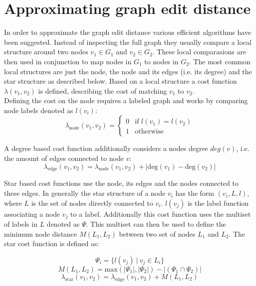 \documentclass[
    12pt,                               %
    DIV=14,                     %
    parskip=half+,              %
    bigheadings,                %
    cleardoubleempty,   %
    halfparskip,                %
    ]{scrreprt} %
\begin{document}
\section{Approximating graph edit distance} \label{sec:approxeditdistance}
In order to approximate the graph edit distance various efficient algorithms have been suggested. Instead of inspecting the full graph they usually compare a local structure around two nodes $v_1 \in G_1$ and $v_2 \in G_2$. These local comparasions are then used in conjunction to map nodes in $G_1$ to nodes in $G_2$. The most common local structures are just the node, the node and its edges (i.e. its degree) and the star structure as described below\cite{commoncost1, commoncost2}. Based on a local structure a cost function $\lambda(v_1, v_2)$ is defined, describing the cost of matching $v_1$ to $v_2$. \\
Defining the cost on the node requires a labeled graph and works by comparing node labels denoted as $l(v_i)$:
\begin{equation}
	\lambda_{\text{node}}(v_1, v_2) = \begin{cases}
		0 & \text{if } l(v_1) = l(v_2) \\
		1 & \text{otherwise}
	\end{cases}
\end{equation}

A degree based cost function additionally considers a nodes degree $deg(v)$, i.e. the amount of edges connected to node $v$:
\begin{equation}
	\lambda_{\text{edge}}(v_1, v_2) = \lambda_{\text{node}}(v_1, v_2) + |\text{deg}(v_1) - \text{deg}(v_2)|
\end{equation}

Star based cost functions use the node, its edges and the nodes connected to these edges. In generally the star structure of a node $v_i$ has the form $(v_i, L, l)$, where $L$ is the set of nodes directly connected to $v_i$. $l(v_j)$ is the label function associating a node $v_j$ to a label. Additionally this cost function uses the multiset of labels in $L$ denoted as $\Psi$. This multiset can then be used to define the minimum node distance $M(L_1, L_2)$ between two set of nodes $L_1$ and $L_2$. The star cost function is defined as\cite{compstars}:

\begin{equation}
	\Psi_i = \{ l(v_j) \: | \: v_j \in L_i \}
\end{equation}
\begin{equation}
	M(L_1, L_2) = \text{max}(|\Psi_1|, |\Psi_2|) - |(\Psi_1 \cap \Psi_2)|
\end{equation}
\begin{equation}
	\lambda_{\text{star}}(v_1, v_2) = \lambda_{\text{edge}}(v_1, v_2) + M(L_1, L_2)
\end{equation}
\end{document}
